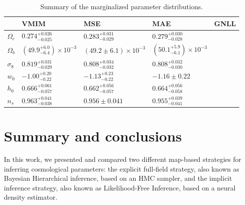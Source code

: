 \documentclass{aa}
\begin{document}
\begin{table}
    \begin{center}
        \begin{tabular}{|l|l|l|l|l|}
            \hline
             & VMIM & MSE & MAE &GNLL \\
            \hline
            \hline
            $\Omega_c$ & $0.274^{+0.026}_{-0.025}$  & $0.283^{+0.031}_{-0.029}$  & $0.279^{+0.030}_{-0.028}$ & \\
            \hline
            $\Omega_b$ & $ \left( 49.9^{+6.0}_{-6.4} \right) \times 10^{-3}$ &  $\left( 49.2\pm 6.1 \right) \times 10^{-3}$ &  $\left( 50.1^{+5.9}_{-6.1} \right) \times 10^{-3}$ &  \\
            \hline
            $\sigma_8$ & $0.819^{+0.031}_{-0.029}$  & $0.808^{+0.034}_{-0.032}$  &  $0.808^{+0.032}_{-0.030}$ &   \\
            \hline
            $w_0$      & $-1.00^{+0.20}_{-0.22}$  & $-1.13^{+0.23}_{-0.22}$ &   $-1.16\pm 0.22$  &  \\
            \hline
            $h_0$      & $0.666^{+0.061}_{-0.057}$ & $0.662^{+0.056}_{-0.057}$  & $0.664^{+0.056}_{-0.058}$  & \\
            \hline
            $n_s$      &  $0.963^{+0.041}_{-0.038}$ &  $0.956 \pm 0.041$ &  $0.955^{+0.039}_{-0.041}$  & \\
            \hline
        \end{tabular}
        \caption{Summary of the marginalized parameter distributions.}
        \label{tab:summaries}
  \end{center}
\end{table}
\section{Summary and conclusions}\label{Sec:conclusion}
 In this work, we presented and compared two different map-based strategies for inferring cosmological parameters: the explicit full-field strategy, also known as Bayesian Hierarchical inference, based on an HMC sampler, and the implicit inference strategy, also known as Likelihood-Free Inference, based on a neural density estimator.
\end{document}
